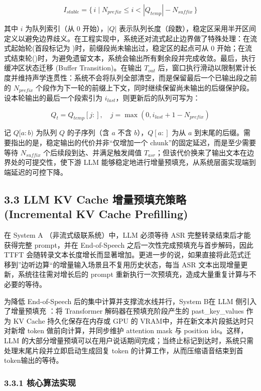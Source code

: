 \documentclass[UTF8,a4paper,12pt]{ctexart}
\begin{document}
\[
I_{stable}=\{\, i \mid N_{prefix}\le i < |Q_{temp}|-N_{suffix}\,\}
\]


其中 $i$ 为队列索引（从 0 开始），$|Q|$ 表示队列长度（段数），稳定区采用半开区间定义以避免边界歧义。在工程实现中，系统还对流式起止边界做了特殊处理：在流式起始轮(首段标记为 \texttt{})时，前缀段尚未输出过，稳定区的起点可从 0 开始；在流式结束轮(\texttt{})时，为避免遗留文本，系统会输出所有剩余段并完成收敛。最后，执行缓冲区状态迁移 (Buffer Transition)。在输出 $T_{out}$ 后，窗口执行滑动以限制累计长度并维持声学连贯性：系统不会将队列全部清空，而是保留最后一个已输出段之前的 $N_{prefix}$ 个段作为下一轮的前缀上下文，同时继续保留尚未输出的后缀保护段。设本轮输出的最后一个段索引为 $i_{last}$，则更新后的队列可写为：

\[
Q_t = Q_{temp}[j:],\quad j=\max(0, i_{last}+1-N_{prefix})
\]


记 $Q[a:b)$ 为队列 $Q$ 的子序列（含 $a$ 不含 $b$），$Q[a:]$ 为从 $a$ 到末尾的后缀。需要指出的是，稳定输出的代价并非“仅增加一个 chunk”的固定延迟，而是至少需要等待 $N_{suffix}$ 个后续段到达、并满足触发阈值 $T_{asr}$；但该代价换来了输出文本在边界处的可提交性，使下游 LLM 能够稳定地进行增量预填充，从系统层面实现端到端延迟的可控下降。

\subsection*{3.3 LLM KV Cache 增量预填充策略 (Incremental KV Cache Prefilling)}


在 System A （非流式级联系统）中，LLM 必须等待 ASR 完整转录结束后才能获得完整 prompt，并在 End-of-Speech 之后一次性完成预填充与首步解码，因此 TTFT 会随转录文本长度增长而显著增加。更进一步的说，如果直接将此范式迁移到”边听边算“的增量输入场景且不复用历史状态，每当 ASR 文本出现增量更新，系统往往需对增长后的 prompt 重新执行一次预填充，造成大量重复计算与不必要的等待。

为降低 End-of-Speech 后的集中计算并支撑流水线并行，System B在 LLM 侧引入了增量预填充 ：将 Transformer 解码器在预填充阶段产生的 past\_key\_values 作为 KV Cache 持久化保存在内存或 GPU 的 VRAM中，并在新文本片段抵达时只对新增 token 做前向计算，并同步维护 attention mask 与 position ids。这样，LLM 的大部分增量预填可以在用户说话期间完成；当终止标记到达时，系统只需处理末尾片段并立即启动生成回复 token 的计算工作，从而压缩语音结束到首token输出的等待。

\subsubsection*{3.3.1 核心算法实现}
\end{document}
